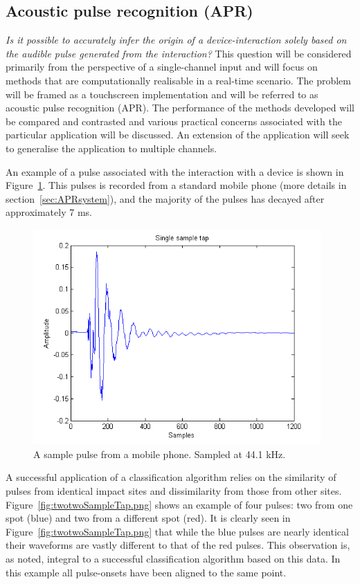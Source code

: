 \subsection{Acoustic pulse recognition (APR)}
\emph{Is it possible to accurately infer the origin of a device-interaction solely based on the audible pulse generated from the interaction?}
This question will be considered primarily from the perspective of a single-channel input and will focus on methods that are computationally realisable in a real-time scenario. The problem will be framed as a touchscreen implementation and will be referred to as acoustic pulse recognition (APR). The performance of the methods developed will be compared and contrasted and various practical concerns associated with the particular application will be discussed. An extension of the application will seek to generalise the application to multiple channels.

An example of a pulse associated with the interaction with a device is shown in Figure~\ref{fig:singleSampleTap.png}. This pulses is recorded from a standard mobile phone (more details in section~\ref{sec:APRsystem}), and the majority of the pulses has decayed after approximately 7 ms.

\begin{figure}
  \begin{center}
    \includegraphics[width=110mm]{singleSampleTap.png}
    \caption{A sample pulse from a mobile phone. Sampled at 44.1 kHz.}\label{fig:singleSampleTap.png}
  \end{center}
\end{figure}

A successful application of a classification algorithm relies on the similarity of pulses from identical impact sites and dissimilarity from those from other sites. Figure~\ref{fig:twotwoSampleTap.png} shows an example of four pulses: two from one spot (blue) and two from a different spot (red). It is clearly seen in Figure~\ref{fig:twotwoSampleTap.png} that while the blue pulses are nearly identical their waveforms are vastly different to that of the red pulses. This observation is, as noted, integral to a successful classification algorithm based on this data. In this example all pulse-onsets have been aligned to the same point.

